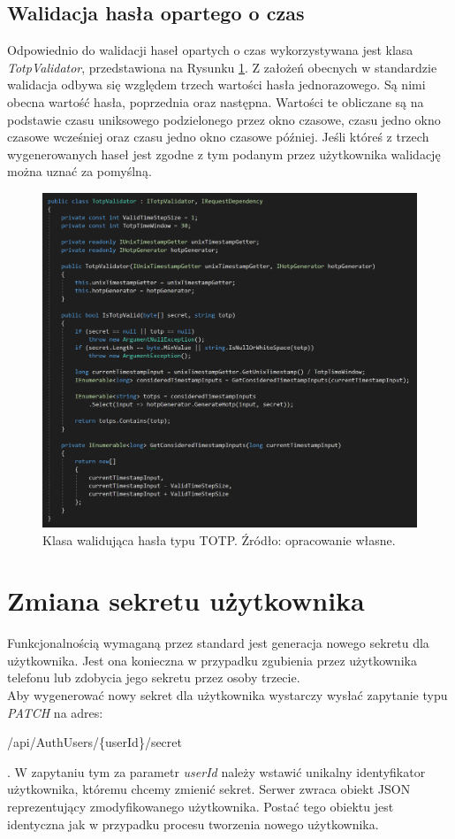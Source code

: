 \subsection{Walidacja hasła opartego o czas}
Odpowiednio do walidacji haseł opartych o czas wykorzystywana jest klasa \textit{TotpValidator}, 
przedstawiona na Rysunku \ref{totp-validator}.
Z założeń obecnych w standardzie walidacja odbywa się względem trzech wartości hasła jednorazowego.
Są nimi obecna wartość hasła, poprzednia oraz następna. 
Wartości te obliczane są na podstawie czasu uniksowego podzielonego przez okno czasowe, 
czasu jedno okno czasowe wcześniej oraz czasu jedno okno czasowe później. 
Jeśli któreś z trzech wygenerowanych haseł jest zgodne z tym podanym przez użytkownika walidację można uznać za pomyślną.
\begin{figure}[t]
    \centering
	\includegraphics[width=\textwidth]{content/images/code-tvalidator}
    \caption{Klasa walidująca hasła typu TOTP. Źródło: opracowanie własne.}
    \label{totp-validator}
\end{figure}

\section{Zmiana sekretu użytkownika}
Funkcjonalnością wymaganą przez standard jest generacja nowego sekretu dla użytkownika.
Jest ona konieczna w przypadku zgubienia przez użytkownika telefonu lub zdobycia jego sekretu przez osoby trzecie. \\
Aby wygenerować nowy sekret dla użytkownika wystarczy wysłać zapytanie typu \textit{PATCH} na adres: \\
\centerline{/api/AuthUsers/\{userId\}/secret}.
W zapytaniu tym za parametr \textit{userId} należy wstawić unikalny identyfikator użytkownika, któremu chcemy zmienić sekret.
Serwer zwraca obiekt JSON reprezentujący zmodyfikowanego użytkownika. 
Postać tego obiektu jest identyczna jak w przypadku procesu tworzenia nowego użytkownika.

